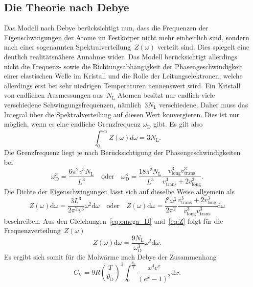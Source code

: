 \subsection{Die Theorie nach Debye}
%
Das Modell nach Debye berücksichtigt nun, dass die Frequenzen der
Eigenschwingungen der Atome im Festkörper nicht mehr einheitlich sind, sondern
nach einer sogenannten Spektralverteilung~$Z(\omega)$ verteilt sind. Dies
spiegelt eine deutlich realitätsnähere Annahme wider. Das Modell berücksichtigt
allerdings nicht die Frequenz- sowie die Richtungsabhängigkeit der
Phasengeschwindigkeit einer elastischen Welle im Kristall und die Rolle der
Leitungselektronen, welche allerdings erst bei sehr niedrigen Temperaturen
nennenswert wird. Ein Kristall von endlichen Ausmessungen aus~$N_{\mathrm{L}}$
Atomen besitzt nur endlich viele verschiedene Schwingungsfrequenzen,
nämlich~$3N_{\mathrm{L}}$ verschiedene. Daher muss das Integral über die
Spektralverteilung auf diesen Wert konvergieren. Dies ist nur möglich, wenn es
eine endliche Grenzfrequenz $\omega_{\mathrm{D}}$ gibt. Es gilt also
%
\begin{equation}
  \int_0^{\omega_{\mathrm{D}}}Z(\omega)d\omega=3N_{\mathrm{L}}.
  \label{eq:konv}
\end{equation}
%
Die Grenzfrequenz liegt je nach Berücksichtigung der Phasengeschwindigkeiten bei
%
\begin{equation}
  \omega_{\mathrm{D}}^3=\frac{6\pi^2v^3N_{\mathrm{L}}}{L^3}\quad\text{oder}\quad\omega_{\mathrm{D}}^3=\frac{18\pi^2N_{\mathrm{L}}}{L^3}\frac{v_{\mathrm{long}}^3v_{\mathrm{trans}}^3}{v_{\mathrm{trans}}^3+2v_{\mathrm{long}}^3}.
  \label{eq:omega_D}
\end{equation}
%
Die Dichte der Eigenschwingungen lässt sich auf dieselbe Weise allgemein als
%
\begin{equation}
  Z(\omega)\mathup{d}\omega=\frac{3L^3}{2\pi^2v^3}\omega^2\mathup{d}\omega\quad\text{oder}\quad Z(\omega)\mathup{d}\omega=\frac{l^3\omega^2}{2\pi^2}\frac{v_{\mathrm{trans}}^3+2v_{\mathrm{long}}^3}{v_{\mathrm{long}}^3v_{\mathrm{trans}}^3}\mathup{d}\omega
  \label{eq:Z}
\end{equation}
%
beschreiben. Aus den Gleichungen~\eqref{eq:omega_D} und~\eqref{eq:Z} folgt für
die Frequenzverteilung~$Z(\omega)$
%
\begin{equation}
  Z(\omega)\mathup{d}\omega=\frac{9N_{\mathrm{L}}}{\omega_{\mathrm{D}}^3}\omega^2\mathup{d}\omega.
\end{equation}
%
Es ergibt sich somit für die Molwärme nach Debye der Zusammenhang
%
\begin{equation}
  C_{\mathrm{V}}=9R\left(\frac{T}{\theta_{\mathrm{D}}}\right)^3\int_0^{\frac{\theta_{\mathrm{D}}}{T}}\frac{x^4e^x}{(e^x-1)^2}\mathup{d}x.
  \label{eq:debyetemperatur}
\end{equation}
